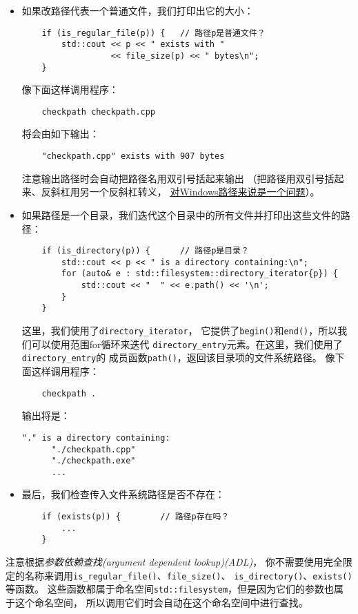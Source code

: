 \begin{itemize}[leftmargin=*]
    \item 如果改路径代表一个普通文件，我们打印出它的大小：
    \begin{lstlisting}
    if (is_regular_file(p)) {   // 路径p是普通文件？
        std::cout << p << " exists with "
                  << file_size(p) << " bytes\n";
    }
    \end{lstlisting}
    像下面这样调用程序：
    \begin{lstlisting}
    checkpath checkpath.cpp
    \end{lstlisting}
    将会由如下输出：
    \begin{lstlisting}
    "checkpath.cpp" exists with 907 bytes
    \end{lstlisting}
    注意输出路径时会自动把路径名用双引号括起来输出
    （把路径用双引号括起来、反斜杠用另一个反斜杠转义，
    \hyperref[ch20.1.1.1]{对Windows路径来说是一个问题}）。
    \item 如果路径是一个目录，我们迭代这个目录中的所有文件并打印出这些文件的路径：
    \begin{lstlisting}
    if (is_directory(p)) {      // 路径p是目录？
        std::cout << p << " is a directory containing:\n";
        for (auto& e : std::filesystem::directory_iterator{p}) {
            std::cout << "  " << e.path() << '\n';
        }
    }
    \end{lstlisting}
    这里，我们使用了\texttt{directory\_iterator}，
    它提供了\texttt{begin()}和\texttt{end()}，所以我们可以使用范围for循环来迭代
    \texttt{directory\_entry}元素。在这里，我们使用了\texttt{directory\_entry}的
    成员函数\texttt{path()}，返回该目录项的文件系统路径。
    像下面这样调用程序：
    \begin{lstlisting}
    checkpath .
    \end{lstlisting}
    输出将是：
    \begin{lstlisting}[stringstyle=\color{black}]
    "." is a directory containing:
      "./checkpath.cpp"
      "./checkpath.exe"
      ...
    \end{lstlisting}
    \item 最后，我们检查传入文件系统路径是否不存在：
    \begin{lstlisting}
    if (exists(p)) {        // 路径p存在吗？
        ...
    }
    \end{lstlisting}
\end{itemize}
注意根据\emph{参数依赖查找(argument dependent lookup)(ADL)}，
你不需要使用完全限定的名称来调用\texttt{is\_regular\_file()}、\texttt{file\_size()}、
\texttt{is\_directory()}、\texttt{exists()}等函数。
这些函数都属于命名空间\texttt{std::filesystem}，但是因为它们的参数也属于这个命名空间，
所以调用它们时会自动在这个命名空间中进行查找。


